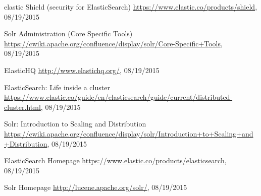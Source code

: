 \begin{thebibliography}{99}
	elastic Shield (security for ElasticSearch)
	\url{https://www.elastic.co/products/shield}, 08/19/2015
	
	Solr Administration (Core Specific Tools)
	\url{https://cwiki.apache.org/confluence/display/solr/Core-Specific+Tools}, 08/19/2015
	
	ElasticHQ
	\url{http://www.elastichq.org/}, 08/19/2015
	
	ElasticSearch: Life inside a cluster
	\url{https://www.elastic.co/guide/en/elasticsearch/guide/current/distributed-cluster.html}, 08/19/2015
	
	Solr: Introduction to Scaling and Distribution
	\url{https://cwiki.apache.org/confluence/display/solr/Introduction+to+Scaling+and+Distribution}, 08/19/2015
	
	ElasticSearch Homepage
	\url{https://www.elastic.co/products/elasticsearch}, 08/19/2015
	
	Solr Homepage
	\url{http://lucene.apache.org/solr/}, 08/19/2015
\end{thebibliography}